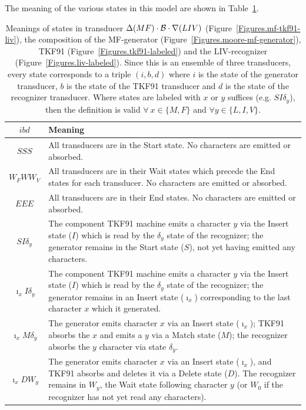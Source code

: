 \documentclass{article}
\newcommand{\tabnum}[1]{\ref{tab.#1}}
\newcommand{\tabref}[1]{Table~\tabnum{#1}}
\newcommand{\tablabel}[1]{\label{tab.#1}}
\newcommand{\figref}[1]{Figure~\ref{Figures.#1}}
\newcommand\tkf{{\cal B}}
\newcommand\generate{\Delta}
\newcommand\recognize{\nabla}
\begin{document}
The meaning of the various states in this model are shown in \tabref{mf-tkf91-liv}.

\begin{table}
\begin{tabular}{c|p{}}
$i b d$ & Meaning \\
\hline
$SSS$ & All transducers are in the Start state.  No characters are emitted or absorbed. 
\\
$W_FWW_V$ & All transducers are in their Wait states which precede the End states for each transducer.  No characters are emitted or absorbed. 
\\
$EEE$ & All transducers are in their End states.  No characters are emitted or absorbed. 
\\
$SI\delta_y$ &
 The component TKF91 machine emits a character $y$ via the Insert state ($I$) which is read by the $\delta_y$ state of the recognizer; the generator remains in the Start state ($S$), not yet having emitted any characters. 
\\
$\imath_x I\delta_y$ &
 The component  TKF91 machine emits a character $y$ via the Insert state ($I$) which is read by the $\delta_y$ state of the recognizer; the generator remains in an Insert state ($\imath_x$) corresponding to the last character $x$ which it generated. 
\\
$\imath_x M\delta_y$ & 
The generator emits character $x$ via an Insert state ($\imath_x$); TKF91 absorbs the $x$ and emits a $y$ via a Match state ($M$);  
the recognizer absorbs the $y$ character via state $\delta_y$.  
\\
$\imath_x D W_y$ & 
The generator emits character $x$ via an Insert state ($\imath_x$), and TKF91 absorbs and deletes it via a Delete state ($D$).  
The recognizer  remains in $W_y$, the Wait  state following character $y$ (or $W_0$ if the recognizer  has not yet read any characters). 
\end{tabular}
\caption{ \tablabel{mf-tkf91-liv} Meanings of states in
transducer $\generate(MF) \cdot \tkf \cdot \recognize(LIV)$ (\figref{mf-tkf91-liv}),
the composition of the MF-generator (\figref{moore-mf-generator}),
TKF91 (\figref{tkf91-labeled}) and
the LIV-recognizer (\figref{liv-labeled}).
Since this is an ensemble of three transducers, every state corresponds to a triple $(i,b,d)$
where
$i$ is the state of the generator transducer,
$b$ is the state of the TKF91 transducer and
$d$ is the state of the recognizer transducer.
Where states are labeled with $x$ or $y$ suffices
(e.g. $SI\delta_y$),
then the definition is valid
$\forall\ x \in \{M,F\}$ and $\forall y \in \{L,I,V\}$.
 }
\end{table}
\end{document}
